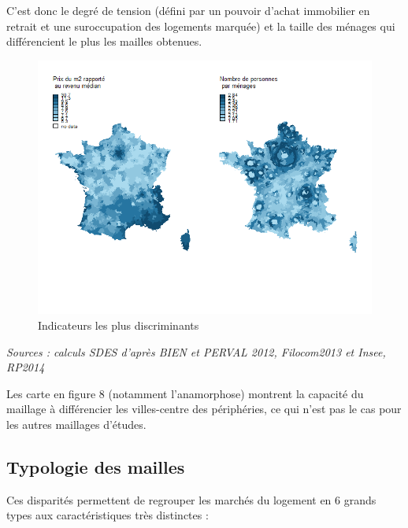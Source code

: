 \documentclass[12pt, a4paper]{article}
\begin{document}
C'est donc le degré de tension (défini par un pouvoir d'achat immobilier en retrait et une suroccupation des logements marquée) et la taille des ménages qui différencient le plus les mailles obtenues. 



\begin{figure}[H]
\caption{Indicateurs les plus discriminants}
\begin{center}
\includegraphics[scale=.8]{img/Discrim_mailles.png}
\end{center}
\end{figure}
\emph{Sources : calculs SDES d'après BIEN et PERVAL 2012, Filocom2013 et Insee, RP2014}

Les carte en figure 8 (notamment l'anamorphose) montrent la capacité du maillage à différencier les villes-centre des périphéries, ce qui n'est pas le cas pour les autres maillages d'études.

\subsection{Typologie des mailles}

Ces disparités permettent de regrouper les marchés du logement en 6 grands types aux caractéristiques très distinctes :
\end{document}
